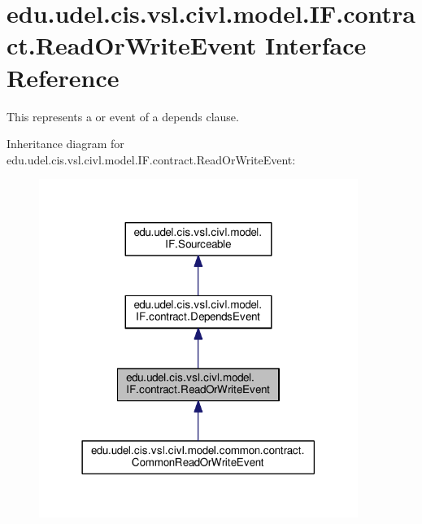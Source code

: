 \hypertarget{interfaceedu_1_1udel_1_1cis_1_1vsl_1_1civl_1_1model_1_1IF_1_1contract_1_1ReadOrWriteEvent}{}\section{edu.\+udel.\+cis.\+vsl.\+civl.\+model.\+I\+F.\+contract.\+Read\+Or\+Write\+Event Interface Reference}
\label{interfaceedu_1_1udel_1_1cis_1_1vsl_1_1civl_1_1model_1_1IF_1_1contract_1_1ReadOrWriteEvent}


This represents a {\ttfamily } or {\ttfamily } event of a {\ttfamily depends} clause.  




Inheritance diagram for edu.\+udel.\+cis.\+vsl.\+civl.\+model.\+I\+F.\+contract.\+Read\+Or\+Write\+Event\+:
\nopagebreak
\begin{figure}[H]
\begin{center}
\leavevmode
\includegraphics[width=294pt]{interfaceedu_1_1udel_1_1cis_1_1vsl_1_1civl_1_1model_1_1IF_1_1contract_1_1ReadOrWriteEvent__inherit__graph}
\end{center}
\end{figure}


